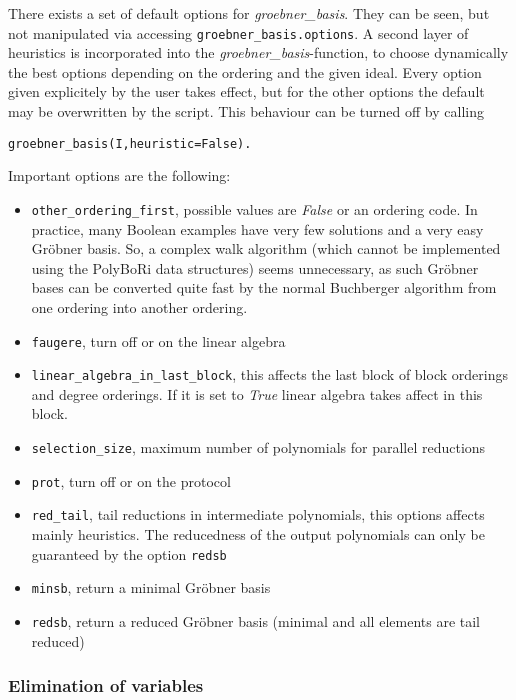 \documentclass[]{article}
\newcommand{\PolyBoRi}{{\sc PolyBoRi}\xspace}
\newcommand{\Groebner}{Gr\"{o}bner\xspace}
\newcommand{\functionname}[1]{\textit{#1}\xspace}
\newcommand{\pythonconstant}[1]{\textit{#1}\xspace}
\newcounter{thm}
\begin{document}
There exists a set of default options for \functionname{groebner\_basis}.
They can be seen, but not manipulated via accessing \verb|groebner_basis.options|.
A second layer of heuristics is incorporated into the \functionname{groebner\_basis}-function, to choose dynamically the best options depending on the ordering and the given ideal.
Every option given explicitely by the user takes effect, but for the other options the default may be overwritten by the script.
This behaviour can be turned off by calling
\begin{verbatim}
groebner_basis(I,heuristic=False).
\end{verbatim}

Important options are the following:
\begin{itemize}
    \item \verb|other_ordering_first|, possible values are \pythonconstant{False} or an ordering code.
    In practice, many Boolean examples have very few solutions and a very easy \Groebner basis. So, a complex walk algorithm (which cannot be implemented using the \PolyBoRi data structures) seems unnecessary, as such \Groebner bases can be converted quite fast by the 
    normal Buchberger algorithm from one ordering into another ordering.
    \item \verb|faugere|, turn off or on the linear algebra
    \item \verb|linear_algebra_in_last_block|, this affects the last block of block orderings and degree orderings. If it is set to \pythonconstant{True} linear algebra takes affect in this block.
    \item \verb|selection_size|, maximum number of polynomials for parallel reductions
    \item \verb|prot|, turn off or on the protocol
    \item \verb|red_tail|, tail reductions in intermediate polynomials, this options affects mainly heuristics. The reducedness of the output polynomials can only be guaranteed by the option \verb|redsb|
    \item \verb|minsb|, return a minimal \Groebner basis
    \item \verb|redsb|, return a reduced \Groebner basis (minimal and all elements are tail reduced)
\end{itemize}

\subsubsection{Elimination of variables}
\end{document}

